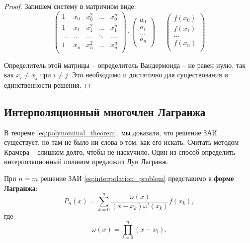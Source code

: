 \documentclass[../main.tex]{subfile}
\begin{document}
\begin{proof}
	Запишем систему в матричном виде:
	\[
	\begin{pmatrix}
		1	& x_0	& x_0^2	& ...	& x_0^n \\
		1	& x_1	& x_1^2	& ...	& x_1^n \\
		...	& ...	& ...	&\ddots	& ...	\\
		1	& x_n	& x_n^2	& ...	& x_n^n \\
	\end{pmatrix}
	\cdot
	\begin{pmatrix}
		a_0 \\
		a_1 \\
		... \\
		a_n \\
	\end{pmatrix}
	=
	\begin{pmatrix}
		f(x_0)	\\
		f(x_1)	\\
		...	\\
		f(x_n)	\\
	\end{pmatrix}
	\]

	Определитель этой матрицы -- определитель Вандермонда -- не равен нулю,
	так как $x_i\ne x_j$ при $i\ne j$. Это необходимо и достаточно для
	существования и единственности решения.
\end{proof}

\subsection{Интерполяционный многочлен Лагранжа}
В теореме \eqref{eq:polynominal_theorem}, мы доказали, что решение ЗАИ
существует, но там не было ни слова о том, как его искать. Считать методом
Крамера -- слишком долго, чтобы не наскучило. Один из способ определить
интерполяционный полином предложил Луи Лагранж.

\begin{theorem}\label{eq:lagrange_polynomial}
	При $n=m$ решение ЗАИ \eqref{eq:interpolation_problem} представимо в
	\textbf{форме Лагранжа}:
	\[P_n(x)=\sum_{k=0}^{n}\frac{\omega(x)}{(x-x_k)\omega'(x_k)}f(x_k),\]
	где
	\[\omega(x)=\prod_{l=0}^{n}(x-x_l).\]
\end{theorem}
\end{document}
